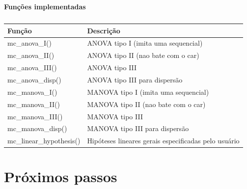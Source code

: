 \documentclass[10pt,
  aspectratio=169,
  serif,
  mathserif,
  professionalfont,
  compress,
  handout,
  ]{beamer}\usepackage[]{graphicx}\usepackage[]{color}
\begin{document}
\begin{frame}[c, allowframebreaks]

\textbf{Funções implementadas}

\begin{table}[]
\begin{tabular}{ll}
\hline
Função                   & Descrição                                            \\ \hline
mc\_anova\_I()           & ANOVA  tipo I   (imita uma sequencial)               \\
mc\_anova\_II()          & ANOVA  tipo II  (nao bate com o car)                 \\
mc\_anova\_III()         & ANOVA  tipo III                                      \\
mc\_anova\_disp()        & ANOVA  tipo III para dispersão                       \\
mc\_manova\_I()          & MANOVA tipo I   (imita uma sequencial)               \\
mc\_manova\_II()         & MANOVA tipo II  (nao bate com o car)                 \\
mc\_manova\_III()        & MANOVA tipo III                                      \\
mc\_manova\_disp()       & MANOVA tipo III para dispersão                       \\
mc\_linear\_hypothesis() & Hipóteses lineares gerais especificadas pelo usuário \\ \hline
\end{tabular}
\caption{}
\label{tab:my-table}
\end{table}

\end{frame}


\section{Próximos passos}
\end{document}
